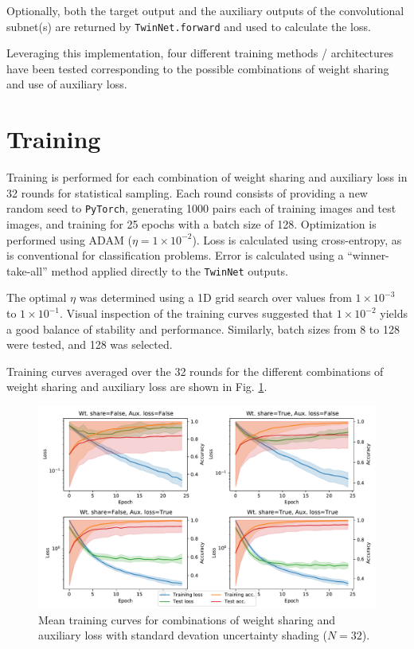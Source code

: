 \documentclass[prl, article, twocolumn]{revtex4-1}
\begin{document}
Optionally, both the target output and the auxiliary outputs of the convolutional subnet(s) are returned by \texttt{TwinNet.forward} and used to calculate the loss.

Leveraging this implementation, four different training methods / architectures have been tested corresponding to the possible combinations of weight sharing and use of auxiliary loss.

\section{Training}
Training is performed for each combination of weight sharing and auxiliary loss in 32 rounds for statistical sampling. Each round consists of providing a new random seed to \texttt{PyTorch}, generating 1000 pairs each of training images and test images, and training for 25 epochs with a batch size of 128. Optimization is performed using ADAM ($\eta = 1\times10^{-2}$). Loss is calculated using cross-entropy, as is conventional for classification problems. Error is calculated using a ``winner-take-all'' method applied directly to the \texttt{TwinNet} outputs.

The optimal $\eta$ was determined using a 1D grid search over values from $1\times10^{-3}$ to $1\times10^{-1}$. Visual inspection of the training curves suggested that $1\times10^{-2}$ yields a good balance of stability and performance. Similarly, batch sizes from 8 to 128 were tested, and 128 was selected.

Training curves averaged over the 32 rounds for the different combinations of weight sharing and auxiliary loss are shown in Fig. \ref{fig:training-curves}.

\begin{figure}[h!]
    \centering
    \includegraphics[width=\linewidth]{figures/avg_histories.pdf}
    \caption{Mean training curves for combinations of weight sharing and auxiliary loss with standard devation uncertainty shading ($N=32$).}
    \label{fig:training-curves}
\end{figure}
\end{document}
